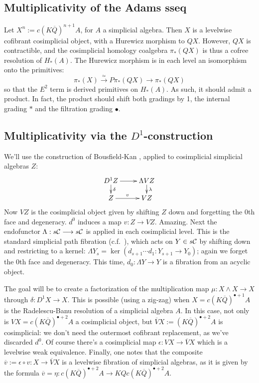 \documentclass[10pt]{article}
\newcommand{\Comm}{\calC}
\begin{document}
\begin{Adams Muliplicativity}
\section{Multiplicativity of the Adams sseq}
Let $X^n:=c(K\overline{Q})^{n+1}A$, for $A$ a simplicial algebra. Then $X$ is a levelwise cofibrant cosimplicial object, with a Hurewicz morphism to $QX$. However, $QX$ is contractible, and the cosimplicial homology coalgebra $\pi_*(QX)$ is thus a cofree resolution of $H_*(A)$. The Hurewicz morphism is in each level an isomorphism onto the primitives:
\[\pi_*(X)\overset{\simeq}{\to}P\pi_*(QX)\overset{}{\to}\pi_*(QX)\]
so that the $E^2$ term is derived primitives on $H_*(A)$. As such, it should admit a product. In fact, the product should shift both gradings by 1, the internal grading $*$ and the filtration grading $\bullet$.

\subsection{Multiplicativity via the $D^1$-construction}
We'll use the construction of Bousfield-Kan \cite{BK_pairings_products.pdf,BK_pairings.pdf}, applied to cosimplicial simplicial algebras $Z$:
\[\xymatrix@R=4mm{
D^1Z\ar[r]
\ar[d]^-{\delta}
&%
\Lambda VZ\ar[d]^-{\lambda}
\\%
Z\ar[r]^-{v}
&%
VZ%
}\]
Now $VZ$ is the cosimplicial object given by shifting $Z$ down and forgetting the 0th face and degeneracy. $d^0$ induces a map $v:Z\to VZ$. Amazing. Next the endofunctor $\Lambda:s\Comm\to s\Comm$ is applied in each cosimplicial level. This is the standard simplicial path fibration (c.f.\ \cite[p.82]{BousKanSSeq.pdf}), which acts on $Y\in s\Comm$ by shifting down and restricting to a kernel: $\Lambda Y_s=\ker(d_{s+1}\cdots d_1:Y_{s+1}\to Y_0)$; again we forget the 0th face and degeneracy. This time, $d_0:\Lambda Y\to Y$ is a fibration from an acyclic object.

The goal will be to create a factorization of the multiplication map $\mu:X\wedge  X\to X$ through $\delta:D^1X\to X$. This is possible (using a zig-zag) when $X=c(K\overline{Q})^{\bullet+1}A$ is the Radelescu-Banu resolution of a simplicial algebra $A$. In this case, not only is $VX=c(K\overline{Q})^{\bullet+2}A$ a cosimplicial object, but $\overline{V}X:=(K\overline{Q})^{\bullet+2}A$ is cosimplicial: we don't need the outermost cofibrant replacement, as we've discarded $d^0$. Of course there's a cosimplicial map $\epsilon:VX\to \overline{V}X$ which is a levelwise weak equivalence. Finally, one notes that the composite $\overline{v}:=\epsilon\circ v:X\to \overline{V}X$ is a levelwise fibration of simplicial algebras, as it is given by the formula $\overline{v}=\eta:c(K\overline{Q})^{\bullet+2}A\to KQc(K\overline{Q})^{\bullet+2}A$. 


\end{Adams Muliplicativity}
\end{document}
